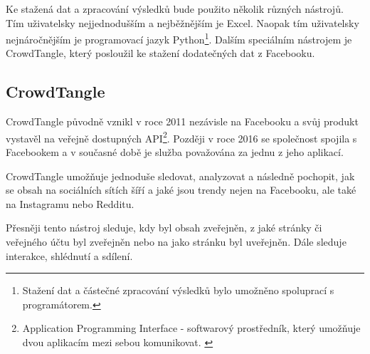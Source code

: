 Ke stažená dat a zpracování výsledků bude použito několik různých nástrojů. Tím uživatelsky nejjednodušším a nejběžnějším je Excel. Naopak tím uživatelsky nejnáročnějším je programovací jazyk Python\footnote{Stažení dat a částečné zpracování výsledků bylo umožněno spoluprací s programátorem.}. Dalším speciálním nástrojem je CrowdTangle, který posloužil ke stažení dodatečných dat z Facebooku.%

    
    
    
    
    \subsection{CrowdTangle}
    
    CrowdTangle původně vznikl v roce 2011 nezávisle na Facebooku a svůj produkt vystavěl na veřejně dostupných API\footnote{Application Programming Interface - softwarový  prostředník, který umožňuje dvou aplikacím mezi sebou komunikovat. \citep{mulesoft_2021}}. Později v roce 2016 se společnost spojila s Facebookem a v současné době je služba považována za jednu z jeho aplikací.~\citep{matt_2016}
    
    CrowdTangle umožňuje jednoduše sledovat, analyzovat a následně pochopit, jak se obsah na sociálních sítích šíří a jaké jsou trendy nejen na Facebooku, ale také na Instagramu nebo Redditu. 
    
    Přesněji tento nástroj sleduje, kdy byl obsah zveřejněn, z jaké stránky či veřejného účtu byl zveřejněn nebo na jako stránku byl uveřejněn. Dále sleduje interakce, shlédnutí a sdílení. 
    

